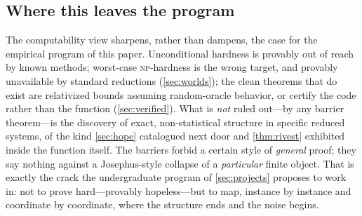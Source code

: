 \subsection{Where this leaves the program}
\label{sec:leaves}

The computability view sharpens, rather than dampens, the case for the
empirical program of this paper. Unconditional hardness is provably out
of reach by known methods; worst-case \textsc{np}-hardness is the wrong
target, and provably unavailable by standard reductions
(\cref{sec:worlds}); the clean theorems that do exist are relativized
bounds assuming random-oracle behavior, or certify the code rather than
the function (\cref{sec:verified}). What is \emph{not} ruled out---by
any barrier theorem---is the discovery of exact, non-statistical
structure in specific reduced systems, of the kind \cref{sec:hope}
catalogued next door and \cref{thm:rivest} exhibited inside the function
itself. The barriers forbid a certain style of \emph{general} proof;
they say nothing against a Josephus-style collapse of a
\emph{particular} finite object. That is exactly the crack the
undergraduate program of \cref{sec:projects} proposes to work in: not to
prove \SHA{} hard---provably hopeless---but to map, instance by instance
and coordinate by coordinate, where the structure ends and the noise
begins.
